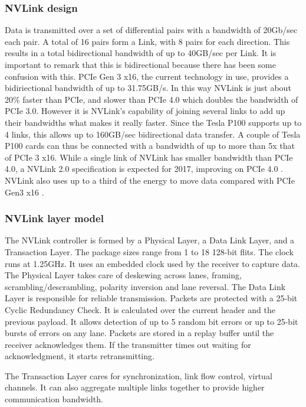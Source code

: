 \subsubsection{NVLink design}
Data is transmitted over a set of differential pairs with a bandwidth of 20Gb/sec each pair.
A total of 16 pairs form a Link, with 8 pairs for each direction.
This results in a total bidirectional bandwidth of up to 40GB/sec per Link.
It is important to remark that this is bidirectional because there has been some confusion with this.
PCIe Gen 3 x16, the current technology in use, provides a bidiriectional bandwidth of up to 31.75GB/s.
In this way NVLink is just about 20\% faster than PCIe, and slower than PCIe 4.0 which doubles the bandwidth of PCIe 3.0.
However it is NVLink's capability of joining several links to add up their bandwidths what makes it really faster.
Since the Tesla P100 supports up to 4 links, this allows up to 160GB/sec bidirectional data transfer.
A couple of Tesla P100 cards can thus be connected with a bandwidth of up to more than 5x that of PCIe 3 x16.
While a single link of NVLink has smaller bandwidth than PCIe 4.0, a NVLink 2.0 specification is expected for 2017, improving on PCIe 4.0 \cite{nextplatform:nvlink}.
NVLink also uses up to a third of the energy to move data compared with PCIe Gen3 x16 \cite{nvidia:hpcnvlink}.

\subsubsection{NVLink layer model}
The NVLink controller is formed by a Physical Layer, a Data Link Layer, and a Transaction Layer.
The package sizes range from 1 to 18 128-bit flits.
The clock runs at 1.25GHz.
It uses an embedded clock used by the receiver to capture data.
The Physical Layer takes care of deskewing across lanes, framing, scrambling/descrambling, polarity inversion and lane reversal.
The Data Link Layer is responsible for reliable transmission.
Packets are protected with a 25-bit Cyclic Redundancy Check.
It is calculated over the current header and the previous payload.
It allows detection of up to 5 random bit errors or up to 25-bit bursts of errors on any lane.
Packets are stored in a replay buffer until the receiver acknowledges them.
If the transmitter times out waiting for acknowledgment, it starts retransmitting.

The Transaction Layer cares for synchronization, link flow control, virtual channels.
It can also aggregate multiple links together to provide higher communication bandwidth.

